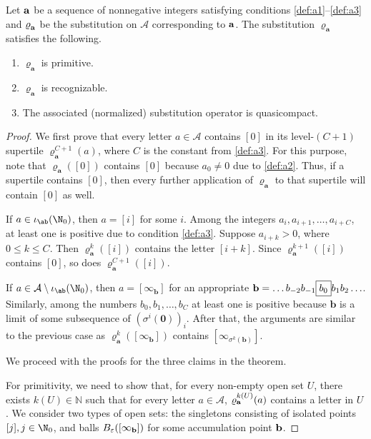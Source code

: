 \begin{thm}\label{thm:primrecquasi}
Let $\bf{a}$ be a sequence of nonnegative integers satisfying conditions \textnormal{\ref{def:a1}--\ref{def:a3}} and $\varrho^{ }_{\bf{a}}$ be the substitution on  $\mathcal{A}$ corresponding to $\bf{a}$.
The substitution $\varrho^{ }_\mathbf a$ satisfies the following.
\begin{enumerate}[label={{\rm (\roman*)}}]
\item $\varrho^{ }_\mathbf a$ is primitive.
\item $\varrho^{ }_\mathbf a$ is recognizable. 
\item The associated (normalized) substitution operator is quasicompact. 
\end{enumerate}
\end{thm}
\begin{proof}


We first prove that every letter $a\in \mathcal{A}$ contains $[0]$ in its level-$(C+1)$ supertile $\varrho_\mathbf a^{C+1}(a)$, where $C$ is the constant from \ref{def:a3}. For this purpose, note that $\varrho^{ }_\mathbf a([0])$ contains $[0]$ because $a_0\neq 0$ due to \ref{def:a2}. Thus, if a supertile contains $[0]$, then every further application of $\varrho^{ }_\mathbf a$ to that supertile will contain $[0]$ as well.

If $a\in \iota_{\ab}(\N_0)$, then $a=[i]$ for some $i$. Among the integers $a_i,a_{i+1},\ldots,a_{i+C}$, at least one is positive due to condition \ref{def:a3}. Suppose $a_{i+k}>0$, where $0\leq k \leq C$. Then $\varrho_\mathbf a^{k}([i])$ contains the letter $[i+k]$. Since $\varrho_\mathbf a^{k+1}([i])$ contains $[0]$, so does $\varrho_\mathbf a^{C+1}([i])$.

If $a\in \mathcal{A}\setminus \iota_{\ab}(\N_0)$, then $a=[\infty_\mathbf b]$ for an appropriate $\mathbf b=\ldots b_{-2}b_{-1}\fbox{$b_0$}b_1b_2\ldots$. Similarly, among the numbers $b_0,b_1,\ldots,b_C$ at least one is positive because $\mathbf b$ is a limit of some subsequence of $(\sigma^i(\mathbf 0))_i$. After that, the arguments are similar to the previous case as $\varrho_\mathbf a^{k}([\infty_\mathbf b])$ contains $[\infty_{\sigma^k(\mathbf b)}]$.


%

We proceed with the proofs for the three claims in the theorem.

For primitivity, we need to show that, for every non-empty open set $U$, there exists $k(U)\in\mathbb{N}$ such that for every letter $a\in \mathcal{A}$, $\varrho_{\bf{a}}^{k(U)}(a)$ contains a letter in $U$. 
We consider two types of open sets: the singletons consisting of isolated points $[j],j\in\N_0$, and balls $B_{\varepsilon}([\infty_{\bf{b}}])$ for some accumulation point $\bf{b}$. 


\end{proof}
